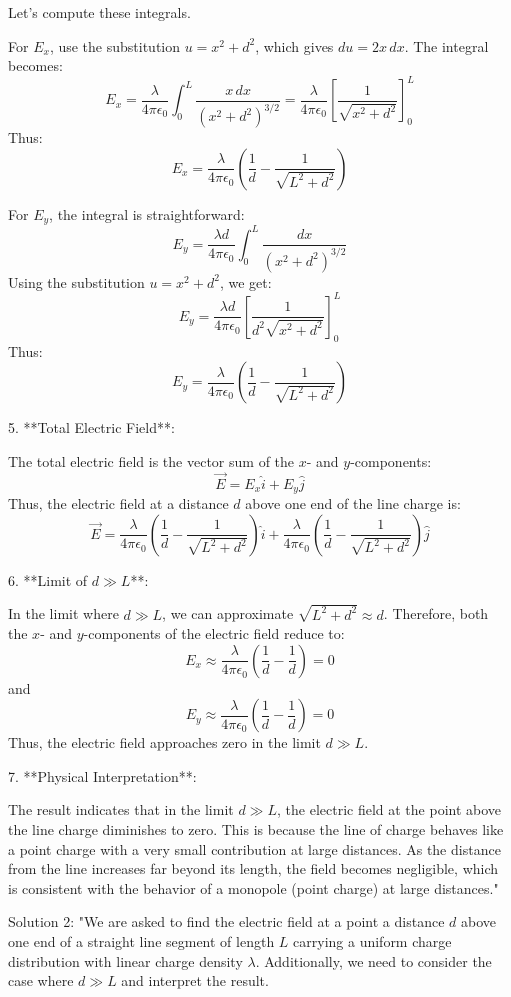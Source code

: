 Let's compute these integrals.

For \( E_x \), use the substitution \( u = x^2 + d^2 \), which gives \( du = 2x \, dx \). The integral becomes:
\[
E_x = \frac{\lambda}{4 \pi \epsilon_0} \int_0^L \frac{x \, dx}{(x^2 + d^2)^{3/2}} = \frac{\lambda}{4 \pi \epsilon_0} \left[ \frac{1}{\sqrt{x^2 + d^2}} \right]_0^L
\]
Thus:
\[
E_x = \frac{\lambda}{4 \pi \epsilon_0} \left( \frac{1}{d} - \frac{1}{\sqrt{L^2 + d^2}} \right)
\]

For \( E_y \), the integral is straightforward:
\[
E_y = \frac{\lambda d}{4 \pi \epsilon_0} \int_0^L \frac{dx}{(x^2 + d^2)^{3/2}}
\]
Using the substitution \( u = x^2 + d^2 \), we get:
\[
E_y = \frac{\lambda d}{4 \pi \epsilon_0} \left[ \frac{1}{d^2 \sqrt{x^2 + d^2}} \right]_0^L
\]
Thus:
\[
E_y = \frac{\lambda}{4 \pi \epsilon_0} \left( \frac{1}{d} - \frac{1}{\sqrt{L^2 + d^2}} \right)
\]

5. **Total Electric Field**:

The total electric field is the vector sum of the \( x \)- and \( y \)-components:
\[
\vec{E} = E_x \hat{i} + E_y \hat{j}
\]
Thus, the electric field at a distance \( d \) above one end of the line charge is:
\[
\vec{E} = \frac{\lambda}{4 \pi \epsilon_0} \left( \frac{1}{d} - \frac{1}{\sqrt{L^2 + d^2}} \right) \hat{i} + \frac{\lambda}{4 \pi \epsilon_0} \left( \frac{1}{d} - \frac{1}{\sqrt{L^2 + d^2}} \right) \hat{j}
\]

6. **Limit of \( d \gg L \)**:

In the limit where \( d \gg L \), we can approximate \( \sqrt{L^2 + d^2} \approx d \). Therefore, both the \( x \)- and \( y \)-components of the electric field reduce to:
\[
E_x \approx \frac{\lambda}{4 \pi \epsilon_0} \left( \frac{1}{d} - \frac{1}{d} \right) = 0
\]
and
\[
E_y \approx \frac{\lambda}{4 \pi \epsilon_0} \left( \frac{1}{d} - \frac{1}{d} \right) = 0
\]
Thus, the electric field approaches zero in the limit \( d \gg L \).

7. **Physical Interpretation**:

The result indicates that in the limit \( d \gg L \), the electric field at the point above the line charge diminishes to zero. This is because the line of charge behaves like a point charge with a very small contribution at large distances. As the distance from the line increases far beyond its length, the field becomes negligible, which is consistent with the behavior of a monopole (point charge) at large distances."

Solution 2:
"We are asked to find the electric field at a point a distance \( d \) above one end of a straight line segment of length \( L \) carrying a uniform charge distribution with linear charge density \( \lambda \). Additionally, we need to consider the case where \( d \gg L \) and interpret the result.

